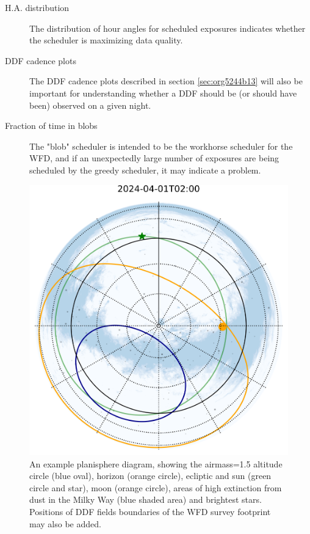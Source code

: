 \begin{description}
\item[{H.A. distribution}] The distribution of hour angles for scheduled exposures indicates whether the scheduler is maximizing data quality.
\item[{DDF cadence plots}] The DDF cadence plots described in section \ref{sec:org5244b13} will also be important for understanding whether a DDF should be (or should have been) observed on a given night.
\item[{Fraction of time in blobs}] The "blob" scheduler is intended to be the workhorse scheduler for the WFD, and if an unexpectedly large number of exposures are being scheduled by the greedy scheduler, it may indicate a problem.
\end{description}

\begin{figure}[htbp]
\centering
\includegraphics[height=0.4\textheight]{./figures/airmass_map.png}
\caption{\label{fig:org8e8aaa8}An example planisphere diagram, showing the airmass=1.5 altitude circle (blue oval), horizon (orange circle), ecliptic and sun (green circle and star), moon (orange circle), areas of high extinction from dust in the Milky Way (blue shaded area) and brightest stars. Positions of DDF fields boundaries of the WFD survey footprint may also be added.}
\end{figure}

